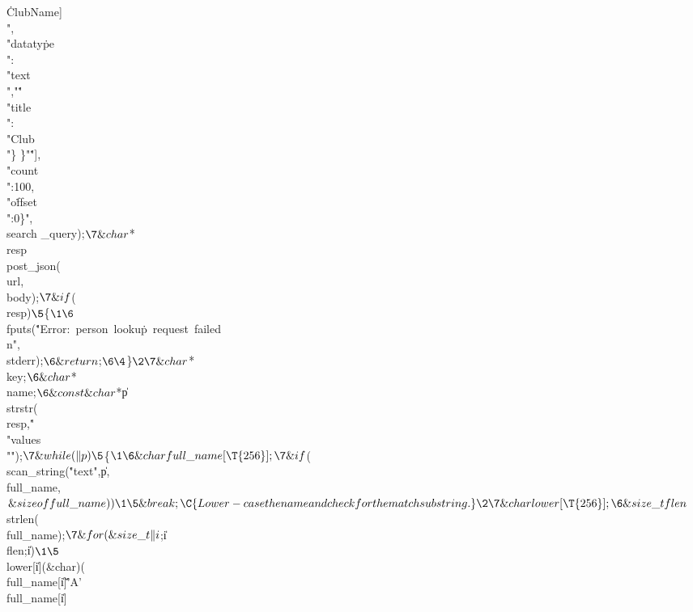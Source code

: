 \.{ClubName]\\",\\"dataty}\)\.{pe\\":\\"text\\","}\.{"\\"title\\":\\"Club\\"\}}%
\)\.{\}"}\.{"],\\"count\\":100,\\"o}\)\.{ffset\\":0\}"},\\{search%
\_query});{}$\7
\&{char} ${}{*}\\{resp}\K\\{post\_json}(\\{url},\\{body});{}$\7
\&{if} ${}(\R\\{resp}){}$\5
${}\{{}$\1\6
${}\\{fputs}(\.{"Error:\ person\ looku}\)\.{p\ request\ failed\\n"},%
\\{stderr});{}$\6
\&{return} ${}\NULL;{}$\6
\4${}\}{}$\2\7
\&{char} ${}{*}\\{key}\K\NULL;{}$\6
\&{char} ${}{*}\\{name}\K\NULL;{}$\6
\&{const} \&{char} ${}{*}\|p\K\\{strstr}(\\{resp},\.{"\\"values\\""});{}$\7
\&{while} (\|p)\5
${}\{{}$\1\6
\&{char} \\{full\_name}[\T{256}];\7
\&{if} ${}(\R\\{scan\_string}(\.{"text"},\|p,\\{full\_name},$%
\&{sizeof} \\{full\_name}))\1\5
\&{break};\C{ Lower-case the name and check for the match substring. }\2\7
\&{char} \\{lower}[\T{256}];\6
\&{size\_t} \\{flen}${}\K\\{strlen}(\\{full\_name});{}$\7
\&{for} (\&{size\_t} \|i${}\K{};{}$ ${}\|i\Z\\{flen};{}$ ${}\|i\PP){}$\1\5
${}\\{lower}[\|i]\K(\&{char})(\\{full\_name}[\|i]\G\.{'A'}\W\\{full\_name}[\|i]%
